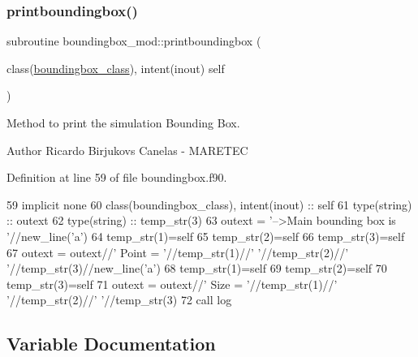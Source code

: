 \subsubsection{\texorpdfstring{printboundingbox()}{printboundingbox()}}
{\footnotesize\ttfamily subroutine boundingbox\+\_\+mod\+::printboundingbox (\begin{DoxyParamCaption}\item[{class(\mbox{\hyperlink{structboundingbox__mod_1_1boundingbox__class}{boundingbox\+\_\+class}}), intent(inout)}]{self }\end{DoxyParamCaption})\hspace{0.3cm}{\ttfamily [private]}}



Method to print the simulation Bounding Box. 

\begin{DoxyAuthor}{Author}
Ricardo Birjukovs Canelas -\/ M\+A\+R\+E\+T\+EC 
\end{DoxyAuthor}


Definition at line 59 of file boundingbox.\+f90.


\begin{DoxyCode}
59     \textcolor{keywordtype}{implicit none}
60     \textcolor{keywordtype}{class}(boundingbox\_class), \textcolor{keywordtype}{intent(inout)} :: self
61     \textcolor{keywordtype}{type}(string) :: outext
62     \textcolor{keywordtype}{type}(string) :: temp\_str(3)
63     outext = \textcolor{stringliteral}{'-->Main bounding box is '}//new\_line(\textcolor{stringliteral}{'a'})
64     temp\_str(1)=self%
65     temp\_str(2)=self%
66     temp\_str(3)=self%
67     outext = outext//\textcolor{stringliteral}{'       Point = '}//temp\_str(1)//\textcolor{stringliteral}{' '}//temp\_str(2)//\textcolor{stringliteral}{' '}//temp\_str(3)//new\_line(\textcolor{stringliteral}{'a'})
68     temp\_str(1)=self%
69     temp\_str(2)=self%
70     temp\_str(3)=self%
71     outext = outext//\textcolor{stringliteral}{'       Size = '}//temp\_str(1)//\textcolor{stringliteral}{' '}//temp\_str(2)//\textcolor{stringliteral}{' '}//temp\_str(3)
72     \textcolor{keyword}{call }log%
\end{DoxyCode}


\subsection{Variable Documentation}
\mbox{\label{namespaceboundingbox__mod_a45e98e492bb546328c98f618a74622ec}} 

